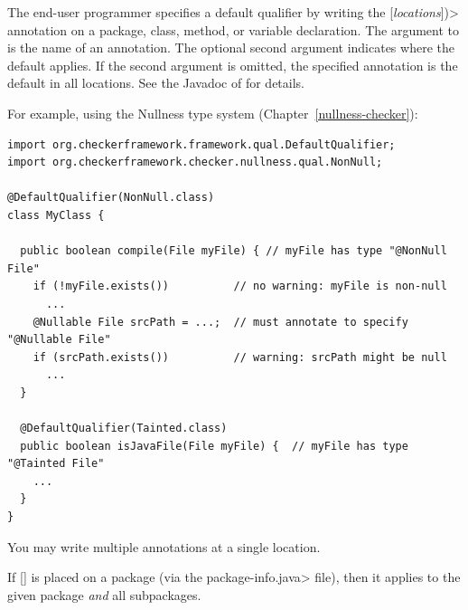 The end-user programmer specifies a default qualifier by writing the
[\emph{locations}]\<)>
annotation on a package, class, method, or variable declaration.  The
argument to  is the 
name of an annotation.
The optional second argument indicates where the default
applies.  If the second argument is omitted, the specified annotation is
the default in all locations.  See the Javadoc of  for details.

For example, using the Nullness type system (Chapter~\ref{nullness-checker}):

\begin{Verbatim}
import org.checkerframework.framework.qual.DefaultQualifier;
import org.checkerframework.checker.nullness.qual.NonNull;

@DefaultQualifier(NonNull.class)
class MyClass {

  public boolean compile(File myFile) { // myFile has type "@NonNull File"
    if (!myFile.exists())          // no warning: myFile is non-null
      ...
    @Nullable File srcPath = ...;  // must annotate to specify "@Nullable File"
    if (srcPath.exists())          // warning: srcPath might be null
      ...
  }

  @DefaultQualifier(Tainted.class)
  public boolean isJavaFile(File myFile) {  // myFile has type "@Tainted File"
    ...
  }
}
\end{Verbatim}

You may write multiple
 annotations at a single location.

If [] is placed on a package (via the
\<package-info.java> file), then it applies to the given package \emph{and}
all subpackages.






